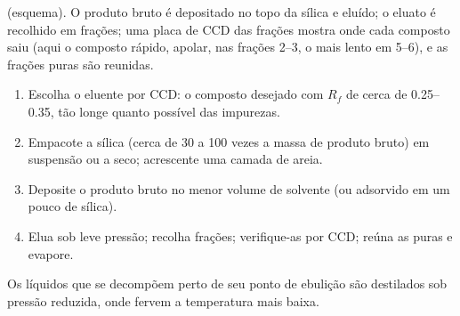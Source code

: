 \begin{omfigure}
\par\vspace{4pt}

{\small {} (esquema). O produto bruto é depositado no topo da sílica e eluído; o
eluato é recolhido em frações; uma placa de CCD das frações mostra onde cada composto saiu (aqui o
composto rápido, apolar, nas frações 2--3, o mais lento em 5--6), e as frações puras são reunidas.}
\end{omfigure}

\begin{method}\label{met:b2:lab-techniques-2:flash}
\begin{enumerate}
  \item Escolha o eluente por CCD: o composto desejado com $R_f$ de cerca de 0.25--0.35, tão longe quanto
        possível das impurezas.
  \item Empacote a sílica (cerca de 30 a 100 vezes a massa de produto bruto) em suspensão ou a seco;
        acrescente uma camada de areia.
  \item Deposite o produto bruto no menor volume de solvente (ou adsorvido em um pouco de sílica).
  \item Elua sob leve pressão; recolha frações; verifique-as por CCD; reúna as puras e
        evapore.
\end{enumerate}
\end{method}

Os líquidos que se decompõem perto de seu ponto de ebulição são destilados sob pressão reduzida, onde
fervem a temperatura mais baixa.

